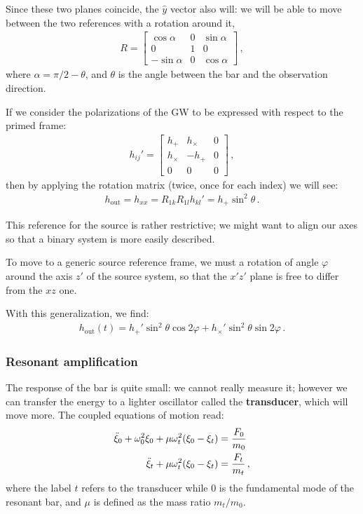 \documentclass[main.tex]{subfiles}
\begin{document}
Since these two planes coincide, the \(\hat{y}\) vector also will: we will be able to move between the two references with a rotation around it, 
%
\begin{align}
R = \left[\begin{array}{ccc}
\cos \alpha  & 0 & \sin \alpha  \\ 
0 & 1 & 0 \\ 
- \sin \alpha  & 0 & \cos \alpha 
\end{array}\right]
\,,
\end{align}
%
where \(\alpha = \pi /2 - \theta \), and \(\theta \) is the angle between the bar and the observation direction. 

If we consider the polarizations of the GW to be expressed with respect to the primed frame: 
%
\begin{align}
h_{ij}' = \left[\begin{array}{ccc}
h_{+} & h_{ \times } & 0 \\ 
h_{ \times } & -h_{+} & 0 \\ 
0 & 0 & 0
\end{array}\right]
\,,
\end{align}
%
then by applying the rotation matrix (twice, once for each index) we will see:
%
\begin{align}
h _{\text{out}} = h_{xx} = 
R_{1k} R_{1l} h_{kl}'
= h_{+} \sin^2\theta 
\,.
\end{align}

This reference for the source is rather restrictive; we might want to align our axes so that a binary system is more easily described. 

To move to a generic source reference frame, we must a rotation of angle \(\varphi \) around the axis \(z'\) of the source system, so that the \(x' z'\) plane is free to differ from the \(xz\) one. 

With this generalization, we find:
%
\begin{align}
h _{\text{out}} (t) = h_{+}' \sin^2\theta \cos 2 \varphi + h_{ \times }' \sin^2 \theta \sin 2 \varphi 
\,.
\end{align}

\subsubsection{Resonant amplification}

The response of the bar is quite small: we cannot really measure it; however we can transfer the energy to a lighter oscillator called the \textbf{transducer}, which will move more. 
The coupled equations of motion read: 
%
\begin{align}
\ddot{\xi}_{0} + \omega_0^2 \xi_0 + \mu \omega_{t}^2 \qty(\xi_0 - \xi_t)
&= \frac{F_0}{m_0 }  \\
\ddot{\xi}_{t} + \mu \omega_{t}^2 \qty(\xi_0 - \xi_t) &= \frac{F_t}{m_t}
\,,
\end{align}
%
where the label \(t\) refers to the transducer while \(0\) is the fundamental mode of the resonant bar, and \(\mu \) is defined as the mass ratio \(m_t / m_0\). 
\end{document}

